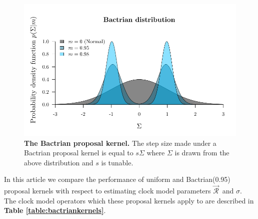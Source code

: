 \documentclass[10pt,letterpaper]{article}
\begin{document}
\begin{figure}[!h]
\includegraphics[width=\textwidth]{Figures/bactrian.pdf}
\caption{\textbf{The Bactrian proposal kernel.} The step size made under a Bactrian proposal kernel is equal to $s \Sigma$ where $\Sigma$ is drawn from the above distribution and $s$ is tunable.   }
\label{fig:bactrian}
\end{figure}





In this article we compare the performance of uniform and Bactrian(0.95) proposal kernels with respect to estimating clock model parameters $\vec{\mathcal{R}}^{\,}$ and $\sigma$. 
The clock model operators which these proposal kernels apply to are described in \textbf{Table \ref{table:bactriankernels}}.
\end{document}
